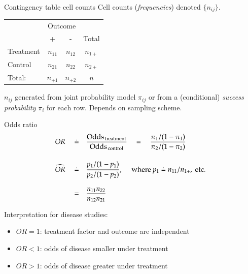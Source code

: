 \documentclass[serif,mathserif,professionalfonts]{beamer}
\begin{document}
\begin{frame}{Contingency table cell counts}
Cell counts (\emph{frequencies}) denoted $\{n_{ij}\}$.

\vspace{-0.3cm}
\begin{center}
\small
\begin{tabular}{lccc}
                  & \multicolumn{2}{c}{Outcome} &          \\
                          \cmidrule{2-3}                             
           &         +        &               -                  & Total  \\  \midrule  
Treatment  &       $n_{11}$    &            $n_{12}$              & $n_{1+}$\\
Control    &       $n_{21}$    &            $n_{22}$              & $n_{2+}$\\  \midrule 
Total:     &       $n_{+1}$    &            $n_{+2}$              & $n$
\end{tabular}
\end{center}

$n_{ij}$ generated from joint probability model $\pi_{ij}$ or from a
(conditional) \emph{success probability} $\pi_i$ for each row.  Depends on
sampling scheme.
\end{frame}


\begin{frame}{Odds ratio}
\begin{align*}
    OR \quad \doteq& \quad \frac{{\rm Odds}_{\rm \, treatment}}
                                    {{\rm Odds}_{\rm \, control}} 
    \quad = \quad \frac{\pi_{1}/(1-\pi_{1})}
                  {\pi_{2}/(1-\pi_{2})} \\[0.4cm]
   \widehat{OR}\quad \doteq& \quad  
     \frac{p_{1}/(1-p_{1})}
          {p_{2}/(1-p_{2})}, \quad \text{ where } p_1 \doteq
          n_{11}/n_{1+}, \text{ etc. } \\[0.3cm]
          \quad =& \quad \frac{n_{11} n_{22}}{n_{12} n_{21}}
 \end{align*}
\vspace{-0.5cm}
\begin{block}{Interpretation for disease studies:}
  \vspace{-0.5cm}
   \begin{itemize}
   \item $OR=1$: treatment factor and outcome are independent
   \item $OR<1$: odds of disease smaller under treatment
   \item $OR>1$: odds of disease greater under treatment
  \end{itemize}
\end{block}

\end{frame}
\end{document}
